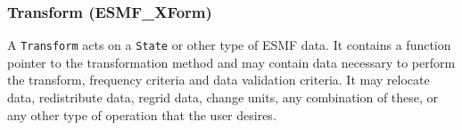 \subsubsection{Transform (ESMF\_XForm)} 
A {\tt Transform} acts on a {\tt State} or other type of 
ESMF data.  It contains a function pointer to the transformation method
and may contain data necessary to perform the transform, frequency 
criteria and data
validation criteria.  It may relocate data, 
redistribute data, regrid data, change units, any combination of these,
or any other type of operation that the user desires.  









